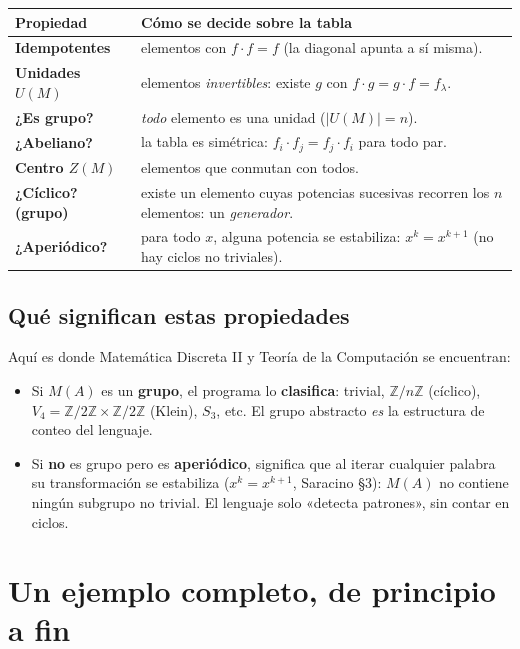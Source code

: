 \documentclass[11pt,a4paper]{article}
\theoremstyle{acc}
\begin{document}
\begin{center}
\renewcommand{\arraystretch}{1.35}
\begin{tabular}{@{}>{\bfseries}p{3.5cm} p{10.5cm}@{}}
\toprule
\normalfont\textbf{Propiedad} & \textbf{Cómo se decide sobre la tabla} \\
\midrule
Idempotentes & elementos con $f\cdot f = f$ (la diagonal apunta a sí misma). \\
Unidades $U(M)$ & elementos \emph{invertibles}: existe $g$ con
   $f\cdot g = g\cdot f = f_\lambda$. \\
¿Es grupo? & \emph{todo} elemento es una unidad ($|U(M)|=n$). \\
¿Abeliano? & la tabla es simétrica: $f_i\cdot f_j = f_j\cdot f_i$ para todo par. \\
Centro $Z(M)$ & elementos que conmutan con todos. \\
¿Cíclico? (grupo) & existe un elemento cuyas potencias sucesivas recorren los
   $n$ elementos: un \emph{generador}. \\
¿Aperiódico? & para todo $x$, alguna potencia se estabiliza:
   $x^{k}=x^{k+1}$ (no hay ciclos no triviales). \\
\bottomrule
\end{tabular}
\end{center}

\subsection{Qué significan estas propiedades}
Aquí es donde Matemática Discreta II y Teoría de la Computación se encuentran:

\begin{itemize}
  \item Si $M(A)$ es un \textbf{grupo}, el programa lo \textbf{clasifica}: trivial,
        $\mathbb{Z}/n\mathbb{Z}$ (cíclico), $V_4=\mathbb{Z}/2\mathbb{Z}\times
        \mathbb{Z}/2\mathbb{Z}$ (Klein), $S_3$, etc. El grupo abstracto
        \emph{es} la estructura de conteo del lenguaje.
  \item Si \textbf{no} es grupo pero es \textbf{aperiódico}, significa que al
        iterar cualquier palabra su transformación se estabiliza
        ($x^{k}=x^{k+1}$, Saracino §3): $M(A)$ no contiene ningún subgrupo no
        trivial. El lenguaje solo «detecta patrones», sin contar en ciclos.
\end{itemize}

\section{Un ejemplo completo, de principio a fin}
\end{document}

